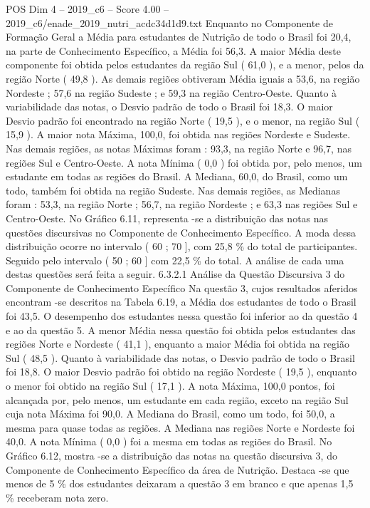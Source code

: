 \begin{textsample}{POS Dim 4 – 2019\_c6 – Score 4.00 – 2019\_c6/enade\_2019\_nutri\_acdc34d1d9.txt}
Enquanto no Componente de Formação Geral a Média para estudantes de Nutrição de todo o Brasil foi 20,4, na parte de Conhecimento Específico, a Média foi 56,3.
A maior Média deste componente foi obtida pelos estudantes da região Sul ( 61,0 ), e a menor, pelos da região Norte ( 49,8 ).
As demais regiões obtiveram Média iguais a 53,6, na região Nordeste ; 57,6 na região Sudeste ; e 59,3 na região Centro-Oeste.
Quanto à variabilidade das notas, o Desvio padrão de todo o Brasil foi 18,3.
O maior Desvio padrão foi encontrado na região Norte ( 19,5 ), e o menor, na região Sul ( 15,9 ).
A maior nota Máxima, 100,0, foi obtida nas regiões Nordeste e Sudeste.
Nas demais regiões, as notas Máximas foram : 93,3, na região Norte e 96,7, nas regiões Sul e Centro-Oeste.
A nota Mínima ( 0,0 ) foi obtida por, pelo menos, um estudante em todas as regiões do Brasil.
A Mediana, 60,0, do Brasil, como um todo, também foi obtida na região Sudeste.
Nas demais regiões, as Medianas foram : 53,3, na região Norte ; 56,7, na região Nordeste ; e 63,3 nas regiões Sul e Centro-Oeste.
No Gráfico 6.11, representa -se a distribuição das notas nas questões discursivas no Componente de Conhecimento Específico.
A moda dessa distribuição ocorre no intervalo ( 60 ; 70 ], com 25,8 \% do total de participantes.
Seguido pelo intervalo ( 50 ; 60 ] com 22,5 \% do total.
A análise de cada uma destas questões será feita a seguir. 6.3.2.1 Análise da Questão Discursiva 3 do Componente de Conhecimento Específico Na questão 3, cujos resultados aferidos encontram -se descritos na Tabela 6.19, a Média dos estudantes de todo o Brasil foi 43,5.
O desempenho dos estudantes nessa questão foi inferior ao da questão 4 e ao da questão 5.
A menor Média nessa questão foi obtida pelos estudantes das regiões Norte e Nordeste ( 41,1 ), enquanto a maior Média foi obtida na região Sul ( 48,5 ).
Quanto à variabilidade das notas, o Desvio padrão de todo o Brasil foi 18,8.
O maior Desvio padrão foi obtido na região Nordeste ( 19,5 ), enquanto o menor foi obtido na região Sul ( 17,1 ).
A nota Máxima, 100,0 pontos, foi alcançada por, pelo menos, um estudante em cada região, exceto na região Sul cuja nota Máxima foi 90,0.
A Mediana do Brasil, como um todo, foi 50,0, a mesma para quase todas as regiões.
A Mediana nas regiões Norte e Nordeste foi 40,0.
A nota Mínima ( 0,0 ) foi a mesma em todas as regiões do Brasil.
No Gráfico 6.12, mostra -se a distribuição das notas na questão discursiva 3, do Componente de Conhecimento Específico da área de Nutrição.
Destaca -se que menos de 5 \% dos estudantes deixaram a questão 3 em branco e que apenas 1,5 \% receberam nota zero.

\end{textsample}
